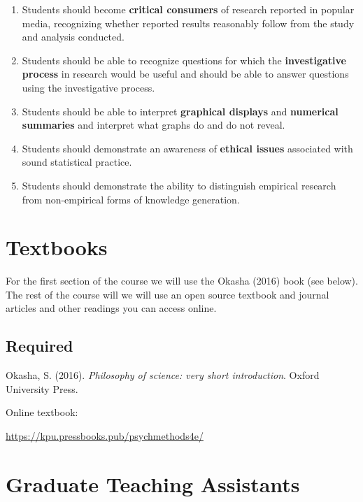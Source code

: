 \documentclass[11pt,]{article}
\providecommand{\tightlist}{%
  \setlength{\itemsep}{0pt}\setlength{\parskip}{0pt}}
\begin{document}
\begin{enumerate}
\def\labelenumi{\arabic{enumi}.}
\tightlist
\item
  Students should become \textbf{critical consumers} of research
  reported in popular media, recognizing whether reported results
  reasonably follow from the study and analysis conducted.
\item
  Students should be able to recognize questions for which the
  \textbf{investigative process} in research would be useful and should
  be able to answer questions using the investigative process.
\item
  Students should be able to interpret \textbf{graphical displays} and
  \textbf{numerical summaries} and interpret what graphs do and do not
  reveal.
\item
  Students should demonstrate an awareness of \textbf{ethical issues}
  associated with sound statistical practice.
\item
  Students should demonstrate the ability to distinguish empirical
  research from non-empirical forms of knowledge generation.
\end{enumerate}

\newpage

\hypertarget{textbooks}{%
\section{Textbooks}\label{textbooks}}

For the first section of the course we will use the Okasha (2016) book
(see below). The rest of the course will we will use an open source
textbook and journal articles and other readings you can access online.

\hypertarget{required}{%
\subsection{Required}\label{required}}

Okasha, S. (2016). \emph{Philosophy of science: very short
introduction}. Oxford University Press.

Online textbook:

\url{https://kpu.pressbooks.pub/psychmethods4e/}

\hypertarget{graduate-teaching-assistants}{%
\section{Graduate Teaching
Assistants}\label{graduate-teaching-assistants}}
\end{document}
